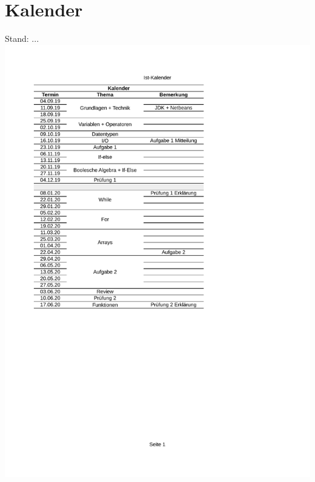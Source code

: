 \documentclass[a4paper]{article}
\begin{document}
	\section{Kalender}
	Stand: \the\day.\the\month.\the\year.\\
	\includegraphics[width=\textwidth]{Kalender}
\end{document}
